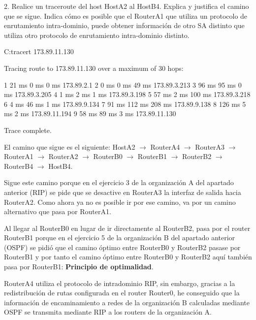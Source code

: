 \newpage
\begin{ejer}
2. Realice un traceroute del host HostA2 al HostB4. Explica y justifica el camino que se sigue. Indica cómo es posible que el RouterA1 que utiliza un protocolo de enrutamiento intra-dominio, puede obtener información de otro SA distinto que utiliza otro protocolo de enrutamiento intra-dominio distinto.
\end{ejer}

\begin{listing}[style=consola]
C:\>tracert 173.89.11.130

Tracing route to 173.89.11.130 over a maximum of 30 hops: 

  1   21 ms     0 ms      0 ms      173.89.2.1
  2   0 ms      0 ms      49 ms     173.89.3.213
  3   96 ms     95 ms     0 ms      173.89.3.205
  4   1 ms      2 ms      1 ms      173.89.3.198
  5   57 ms     2 ms      100 ms    173.89.3.218
  6   4 ms      46 ms     1 ms      173.89.9.134
  7   91 ms     112 ms    208 ms    173.89.9.138
  8   126 ms    5 ms      2 ms      173.89.11.194
  9   58 ms     89 ms     3 ms      173.89.11.130

Trace complete.
\end{listing}
\par El camino que sigue es el siguiente: HostA2 $\rightarrow$ RouterA4 $\rightarrow$ RouterA3 $\rightarrow$ RouterA1 $\rightarrow$ RouterA2 $\rightarrow$ RouterB0 $\rightarrow$ RouterB1 $\rightarrow$ RouterB2 $\rightarrow$ RouterB4 $\rightarrow$ HostB4.
\par Sigue este camino porque en el ejercicio 3 de la organización A del apartado anterior (RIP) se pide que se desactive en RouterA3 la interfaz de salida hacia RouterA2. Como ahora ya no es posible ir por ese camino, va por un camino alternativo que pasa por RouterA1.
\par Al llegar al RouterB0 en lugar de ir directamente al RouterB2, pasa por el router RouterB1 porque en el ejercicio 5 de la organización B del apartado anterior (OSPF) se pidió que el camino óptimo entre RouterB0 y RouterB2 pasase por RouterB1 y por tanto el camino óptimo entre RouterB0 y RouterB2 aquí también pasa por RouterB1: \textbf{Principio de optimalidad}.
\par RouterA4 utiliza el protocolo de intradominio RIP, sin embargo, gracias a la redistribución de rutas configurada en el router Router0, he conseguido que la información de encaminamiento a redes de la organización B calculadas mediante OSPF se transmita mediante RIP a los routers de la organización A.